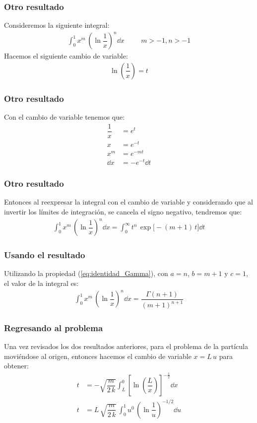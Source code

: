 \begin{frame}
\frametitle{Otro resultado}
Consideremos la siguiente integral:
\begin{align*}
\int_{0}^{1} x^{m} \, \left( \ln \dfrac{1}{x} \right)^{n} \dd{x} \hspace{1cm} m > -1, n > -1
\end{align*}
\pause
Hacemos el siguiente cambio de variable:
\begin{align*}
\ln \left(\dfrac{1}{x} \right) = t
\end{align*}
\end{frame}
\begin{frame}
\frametitle{Otro resultado}
Con el cambio de variable tenemos que:
\begin{align*}
\dfrac{1}{x} &= e^{t} \\[0.5em]
x &= e^{-t} \\[0.5em]
x^{m} &= e^{-m t} \\[0.5em]
\dd{x} &= - e^{-t} \dd{t}
\end{align*}
\end{frame}
\begin{frame}
\frametitle{Otro resultado}
Entonces al reexpresar la integral con el cambio de variable y considerando que al invertir los límites de integración, se cancela el signo negativo, tendremos que:
\begin{align*}
\int_{0}^{1} x^{m} \, \left( \ln \dfrac{1}{x} \right)^{n} \dd{x} = \int_{0}^{\infty} t^{n} \, \exp \big[-(m + 1) \, t \big] \dd{t}
\end{align*}
\end{frame}
\begin{frame}
\frametitle{Usando el resultado}
Utilizando la propiedad (\ref{eq:identidad_Gamma}), con $a = n$, $b = m + 1$ y $c = 1$, el valor de la integral es:
\begin{align}
\int_{0}^{1} x^{m} \, \left( \ln \dfrac{1}{x} \right)^{n} \dd{x} = \dfrac{\Gamma (n + 1)}{(m + 1)^{n+1}}
\label{eq:ecuacion_propiedad_Gamma}
\end{align}
\end{frame}
\begin{frame}
\frametitle{Regresando al problema}
Una vez revisados los dos resultados anteriores, para el problema de la partícula moviéndose al origen, entonces hacemos el cambio de variable $x = L \, u$ para obtener:
\begin{align*}
t &= - \sqrt{\dfrac{m}{2 \, k}} \int_{L}^{0} \left[ \ln(\dfrac{L}{x}) \right]^{-\frac{1}{2}} \dd{x} \\[0.5em]
t &= L \, \sqrt{\dfrac{m}{2 \, k}} \, \int_{0}^{1} u^{0} \, \left( \ln \dfrac{1}{u} \right)^{-1/2} \dd{u}
\end{align*}
\end{frame}
